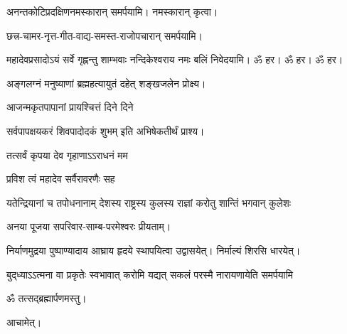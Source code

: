 \begin{center}
अनन्तकोटिप्रदक्षिणनमस्कारान् समर्पयामि। नमस्कारान् कृत्वा।\medskip

छत्त्र-चामर-नृत्त-गीत-वाद्य-समस्त-राजोपचारान् समर्पयामि।\medskip


{महादेवप्रसादोऽयं सर्वे गृह्णन्तु शाम्भवाः}
नन्दिकेश्वराय नमः बलिं निवेदयामि। ॐ हर। ॐ हर। ॐ हर।\medskip

{अङ्गलग्नं मनुष्याणां ब्रह्महत्यायुतं दहेत्}
शङ्खजलेन प्रोक्ष्य।

{आजन्मकृतपापानां प्रायश्चित्तं दिने दिने}

{सर्वपापक्षयकरं शिवपादोदकं शुभम्}
इति अभिषेकतीर्थं प्राश्य।

{तत्सर्वं कृपया देव गृहाणाऽऽराधनं मम}

{प्रविश त्वं महादेव सर्वैरावरणैः सह}

{यतेन्द्रियानां च तपोधनानाम्}
{देशस्य राष्ट्रस्य कुलस्य राज्ञां}
{करोतु शान्तिं भगवान् कुलेशः}


अनया पूजया सपरिवार-साम्ब-परमेश्वरः प्रीयताम्। 



निर्याणमुद्रया पुष्पाण्यादाय आघ्राय हृदये स्थापयित्वा उद्वासयेत्। निर्माल्यं शिरसि धारयेत्।





{बुद्‌ध्याऽऽत्मना वा प्रकृतेः स्वभावात्}
{करोमि यद्यत् सकलं परस्मै}
{नारायणायेति समर्पयामि}


ॐ तत्सद्ब्रह्मार्पणमस्तु।\medskip

आचामेत्।

\end{center}
\closesection
\clearpage
